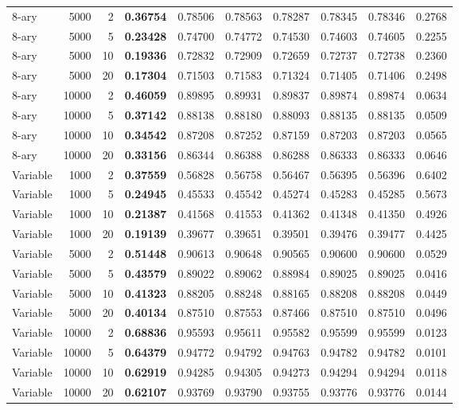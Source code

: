 \begin{longtable}{lrrrrrrrrr}
8-ary & 5000 & 2 & \textbf{0.36754} & 0.78506 & 0.78563 & 0.78287 & \cellcolor{oursbg}0.78345 & 0.78346 & 0.2768 \\
8-ary & 5000 & 5 & \textbf{0.23428} & 0.74700 & 0.74772 & 0.74530 & \cellcolor{oursbg}0.74603 & 0.74605 & 0.2255 \\
8-ary & 5000 & 10 & \textbf{0.19336} & 0.72832 & 0.72909 & 0.72659 & \cellcolor{oursbg}0.72737 & 0.72738 & 0.2360 \\
8-ary & 5000 & 20 & \textbf{0.17304} & 0.71503 & 0.71583 & 0.71324 & \cellcolor{oursbg}0.71405 & 0.71406 & 0.2498 \\
8-ary & 10000 & 2 & \textbf{0.46059} & 0.89895 & 0.89931 & 0.89837 & \cellcolor{oursbg}0.89874 & 0.89874 & 0.0634 \\
8-ary & 10000 & 5 & \textbf{0.37142} & 0.88138 & 0.88180 & 0.88093 & \cellcolor{oursbg}0.88135 & 0.88135 & 0.0509 \\
8-ary & 10000 & 10 & \textbf{0.34542} & 0.87208 & 0.87252 & 0.87159 & \cellcolor{oursbg}0.87203 & 0.87203 & 0.0565 \\
8-ary & 10000 & 20 & \textbf{0.33156} & 0.86344 & 0.86388 & 0.86288 & \cellcolor{oursbg}0.86333 & 0.86333 & 0.0646 \\
Variable & 1000 & 2 & \textbf{0.37559} & 0.56828 & 0.56758 & 0.56467 & \cellcolor{oursbg}0.56395 & 0.56396 & 0.6402 \\
Variable & 1000 & 5 & \textbf{0.24945} & 0.45533 & 0.45542 & 0.45274 & \cellcolor{oursbg}0.45283 & 0.45285 & 0.5673 \\
Variable & 1000 & 10 & \textbf{0.21387} & 0.41568 & 0.41553 & 0.41362 & \cellcolor{oursbg}0.41348 & 0.41350 & 0.4926 \\
Variable & 1000 & 20 & \textbf{0.19139} & 0.39677 & 0.39651 & 0.39501 & \cellcolor{oursbg}0.39476 & 0.39477 & 0.4425 \\
Variable & 5000 & 2 & \textbf{0.51448} & 0.90613 & 0.90648 & 0.90565 & \cellcolor{oursbg}0.90600 & 0.90600 & 0.0529 \\
Variable & 5000 & 5 & \textbf{0.43579} & 0.89022 & 0.89062 & 0.88984 & \cellcolor{oursbg}0.89025 & 0.89025 & 0.0416 \\
Variable & 5000 & 10 & \textbf{0.41323} & 0.88205 & 0.88248 & 0.88165 & \cellcolor{oursbg}0.88208 & 0.88208 & 0.0449 \\
Variable & 5000 & 20 & \textbf{0.40134} & 0.87510 & 0.87553 & 0.87466 & \cellcolor{oursbg}0.87510 & 0.87510 & 0.0496 \\
Variable & 10000 & 2 & \textbf{0.68836} & 0.95593 & 0.95611 & 0.95582 & \cellcolor{oursbg}0.95599 & 0.95599 & 0.0123 \\
Variable & 10000 & 5 & \textbf{0.64379} & 0.94772 & 0.94792 & 0.94763 & \cellcolor{oursbg}0.94782 & 0.94782 & 0.0101 \\
Variable & 10000 & 10 & \textbf{0.62919} & 0.94285 & 0.94305 & 0.94273 & \cellcolor{oursbg}0.94294 & 0.94294 & 0.0118 \\
Variable & 10000 & 20 & \textbf{0.62107} & 0.93769 & 0.93790 & 0.93755 & \cellcolor{oursbg}0.93776 & 0.93776 & 0.0144 \\
\end{longtable}
\endgroup
